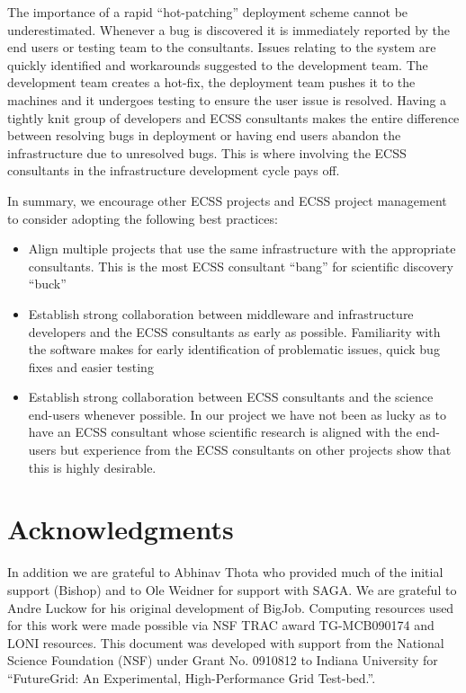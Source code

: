 \documentclass{sig-alternate}
\begin{document}
The importance of a rapid ``hot-patching'' deployment scheme cannot be
underestimated. Whenever a bug is discovered it is immediately
reported by the end users or testing team to the consultants. Issues
relating to the system are quickly identified and workarounds
suggested to the development team. The development team creates a
hot-fix, the deployment team pushes it to the machines and it
undergoes testing to ensure the user issue is resolved. Having a
tightly knit group of developers and ECSS consultants makes the entire
difference between resolving bugs in deployment or having end users
abandon the infrastructure due to unresolved bugs. This is where
involving the ECSS consultants in the infrastructure development cycle
pays off.

In summary, we encourage other ECSS projects and ECSS project
management to consider adopting the following best practices:
\begin{itemize}
 \item Align multiple projects that use the same infrastructure
 with the appropriate consultants. This is the most ECSS consultant
 ``bang'' for scientific discovery ``buck''
 \item Establish strong collaboration between middleware and infrastructure
 developers and the ECSS consultants as early as possible. Familiarity with the software makes for early
 identification of problematic issues, quick bug fixes and easier testing
 \item Establish strong collaboration between ECSS consultants and the science
 end-users whenever possible. In our project we have not been as lucky as to
 have an ECSS consultant whose scientific research is aligned with the end-users
 but experience from the ECSS consultants on other projects show that this is highly
 desirable.
\end{itemize}



\section{Acknowledgments}
In addition we are grateful to Abhinav Thota who provided much of the
initial support (Bishop) and to Ole Weidner for support with SAGA. We
are grateful to Andre Luckow for his original development of BigJob.
Computing resources used for this work were made possible via NSF TRAC
award TG-MCB090174 and LONI resources.  This document was developed
with support from the National Science Foundation (NSF) under Grant
No.  0910812 to Indiana University for ``FutureGrid: An Experimental,
High-Performance Grid Test-bed.''.



\end{document}
